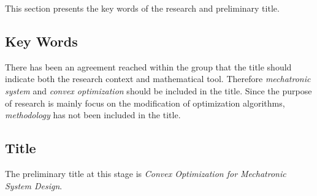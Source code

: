 This section presents the key words of the research and preliminary title.

\subsection{Key Words} 
There has been an agreement reached within the group that the title should indicate both the research context and mathematical tool. Therefore \textit{mechatronic system} and \textit{convex optimization} should be included in the title. Since the purpose of research is mainly focus on the modification of optimization algorithms, \textit{methodology} has not been included in the title.
 
\subsection{Title}
The preliminary title at this stage is \textit{Convex Optimization for Mechatronic System Design}.